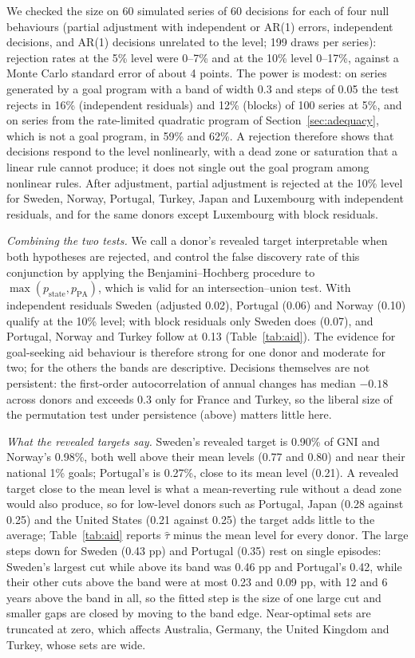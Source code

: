 \documentclass[11pt,a4paper]{article}
\theoremstyle{remark}\newtheorem{remark}{Remark}
\begin{document}
We checked the size on 60 simulated series of 60 decisions for each of four null behaviours (partial adjustment with independent or AR(1) errors, independent decisions, and AR(1) decisions unrelated to the level; 199 draws per series): rejection rates at the 5\% level were 0--7\% and at the 10\% level 0--17\%, against a Monte Carlo standard error of about 4 points. The power is modest: on series generated by a goal program with a band of width 0.3 and steps of 0.05 the test rejects in 16\% (independent residuals) and 12\% (blocks) of 100 series at 5\%, and on series from the rate-limited quadratic program of Section~\ref{sec:adequacy}, which is not a goal program, in 59\% and 62\%. A rejection therefore shows that decisions respond to the level nonlinearly, with a dead zone or saturation that a linear rule cannot produce; it does not single out the goal program among nonlinear rules. After adjustment, partial adjustment is rejected at the 10\% level for Sweden, Norway, Portugal, Turkey, Japan and Luxembourg with independent residuals, and for the same donors except Luxembourg with block residuals.

\emph{Combining the two tests.} We call a donor's revealed target interpretable when both hypotheses are rejected, and control the false discovery rate of this conjunction by applying the Benjamini--Hochberg procedure to $\max(p_{\mathrm{state}},p_{\mathrm{PA}})$, which is valid for an intersection--union test. With independent residuals Sweden (adjusted 0.02), Portugal (0.06) and Norway (0.10) qualify at the 10\% level; with block residuals only Sweden does (0.07), and Portugal, Norway and Turkey follow at 0.13 (Table~\ref{tab:aid}). The evidence for goal-seeking aid behaviour is therefore strong for one donor and moderate for two; for the others the bands are descriptive. Decisions themselves are not persistent: the first-order autocorrelation of annual changes has median $-0.18$ across donors and exceeds 0.3 only for France and Turkey, so the liberal size of the permutation test under persistence (above) matters little here.

\emph{What the revealed targets say.} Sweden's revealed target is 0.90\% of GNI and Norway's 0.98\%, both well above their mean levels (0.77 and 0.80) and near their national 1\% goals; Portugal's is 0.27\%, close to its mean level (0.21). A revealed target close to the mean level is what a mean-reverting rule without a dead zone would also produce, so for low-level donors such as Portugal, Japan (0.28 against 0.25) and the United States (0.21 against 0.25) the target adds little to the average; Table~\ref{tab:aid} reports $\hat\tau$ minus the mean level for every donor. The large steps down for Sweden (0.43 pp) and Portugal (0.35) rest on single episodes: Sweden's largest cut while above its band was 0.46 pp and Portugal's 0.42, while their other cuts above the band were at most 0.23 and 0.09 pp, with 12 and 6 years above the band in all, so the fitted step is the size of one large cut and smaller gaps are closed by moving to the band edge. Near-optimal sets are truncated at zero, which affects Australia, Germany, the United Kingdom and Turkey, whose sets are wide.
\end{document}
